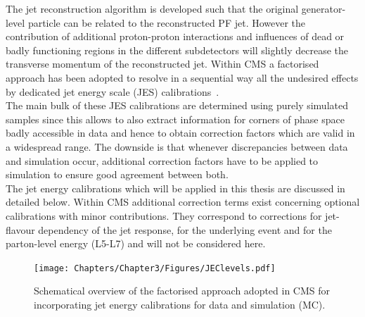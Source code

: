 The jet reconstruction algorithm is developed such that the original generator-level particle can be related to the reconstructed PF jet. However the contribution of additional proton-proton interactions and influences of dead or badly functioning regions in the different subdetectors will slightly decrease the transverse momentum of the reconstructed jet.
Within CMS a factorised approach has been adopted to resolve in a sequential way all the undesired effects by dedicated jet energy scale (JES) calibrations~\cite{JES, JESPerf}.
\\
The main bulk of these JES calibrations are determined using purely simulated samples since this allows to also extract information for corners of phase space badly accessible in data and hence to obtain correction factors which are valid in a widespread range. The downside is that whenever discrepancies between data and simulation occur, additional correction factors have to be applied to simulation to ensure good agreement between both.
\\
The jet energy calibrations which will be applied in this thesis are discussed in detailed below. 
Within CMS additional correction terms exist concerning optional calibrations with minor contributions. They correspond to corrections for jet-flavour dependency of the jet response, for the underlying event and for the parton-level energy (L5-L7) and will not be considered here.
\begin{figure}[h!t]
 \centering
 \texttt{[image: Chapters/Chapter3/Figures/JEClevels.pdf]}
 \caption{Schematical overview of the factorised approach adopted in CMS for incorporating jet energy calibrations for data and simulation (MC).}
 \label{fig::JEClevels}
\end{figure}

